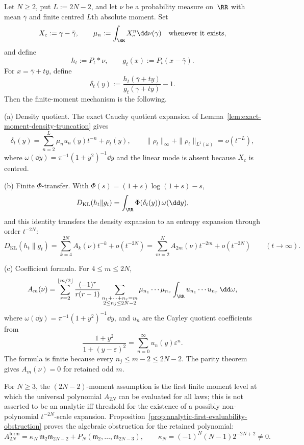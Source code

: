 \begin{theorem}%
\label{thm:poisson-kl-even-orders}
Let \(N\ge2\), put \(L:=2N-2\), and let \(\nu\) be a probability measure
on~\(\RR\) with mean \(\bar{\gamma}\) and finite centred \(L\)th absolute
moment.  Set
\[
X_c:=\gamma-\bar{\gamma},
\qquad
\mu_n:=\int_{\RR}X_c^n\dd\nu(\gamma)\quad\text{whenever it exists},
\]
and define
\[
h_t:=P_t*\nu,
\qquad
g_t(x):=P_t(x-\bar{\gamma}).
\]
For \(x=\bar{\gamma}+ty\), define
\[
\delta_t(y):=\frac{h_t(\bar{\gamma}+ty)}{g_t(\bar{\gamma}+ty)}-1 .
\]
Then the finite-moment mechanism is the following.

\textup{(a) Density quotient.}
The exact Cauchy quotient expansion of
Lemma~\ref{lem:exact-moment-density-truncation} gives
\[
\delta_t(y)
=\sum_{n=2}^{L}\mu_nu_n(y)t^{-n}+\rho_t(y),
\qquad
\|\rho_t\|_\infty+\|\rho_t\|_{L^1(\omega)}=o(t^{-L}),
\]
where \(\omega(\dd y)=\pi^{-1}(1+y^2)^{-1}\dd y\) and the linear mode is
absent because \(X_c\) is centred.

\textup{(b) Finite \(\Phi\)-transfer.}
With \(\Phi(s)=(1+s)\log(1+s)-s\),
\[
D_{\mathrm{KL}}(h_t\|g_t)
=\int_{\RR}\Phi(\delta_t(y))\,\omega(\dd y),
\]
and this identity transfers the density expansion to an entropy expansion
through order \(t^{-2N}\):
\begin{equation}\label{eq:poisson-kl-even-orders}
D_{\mathrm{KL}}(h_t\|g_t)
=\sum_{k=4}^{2N}A_k(\nu)t^{-k}+o(t^{-2N})
=\sum_{m=2}^{N}A_{2m}(\nu)t^{-2m}+o(t^{-2N})
\qquad(t\to\infty).
\end{equation}

\textup{(c) Coefficient formula.}
For \(4\le m\le2N\),
\begin{equation}\label{eq:coefficient-identification-transfer-expansion}
A_m(\nu)=
\sum_{r=2}^{\lfloor m/2\rfloor}
\frac{(-1)^r}{r(r-1)}
\sum_{\substack{n_1+\cdots+n_r=m\\2\le n_j\le 2N-2}}
\mu_{n_1}\cdots\mu_{n_r}
\int_{\RR}u_{n_1}\cdots u_{n_r}\,\dd\omega ,
\end{equation}
where \(\omega(\dd y)=\pi^{-1}(1+y^2)^{-1}\dd y\), and \(u_n\) are the
Cayley quotient coefficients from
\[
\frac{1+y^2}{1+(y-\varepsilon)^2}
=\sum_{n=0}^{\infty}u_n(y)\varepsilon^n .
\]
The formula is finite because every \(n_j\le m-2\le2N-2\).
The parity theorem gives \(A_m(\nu)=0\) for retained odd \(m\).
\end{theorem}

\noindent For \(N\ge3\), the \((2N-2)\)-moment assumption is the first finite
moment level at which the universal polynomial \(A_{2N}\) can be evaluated
for all laws; this is not asserted to be an analytic iff threshold for the
existence of a possibly non-polynomial \(t^{-2N}\)-scale expansion.
Proposition~\ref{prop:analytic-first-evaluability-obstruction} proves the
algebraic obstruction for the retained polynomial:
\[
A^{\mathrm{form}}_{2N}
=\kappa_N\,\mathfrak m_2\mathfrak m_{2N-2}
+P_N(\mathfrak m_2,\ldots,\mathfrak m_{2N-3}),
\qquad
\kappa_N=(-1)^N(N-1)2^{-2N+2}\ne0 .
\]

